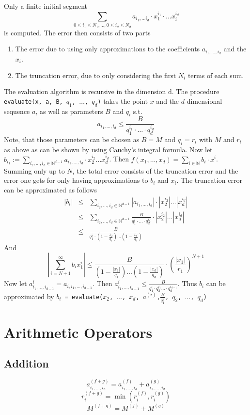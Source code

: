 \documentclass[]{article}
\newcommand{\NN}{\mathbb N}
\newcommand{\abs}[1]{\left|#1\right|}
\newcommand{\code}{\texttt}
\begin{document}
Only a finite initial segment
$$ \sum_{0 \leq i_1 \leq N_1, \dots, 0 \leq i_d \leq N_d } a_{i_1, \dots i_d} \cdot x_1^{i_1} \cdot \dots x_i^{i_d} $$
is computed.
The error then consists of two parts
\begin{enumerate}
  \item The error due to using only approximations to the coefficients $a_{i_1, \dots, i_d}$ and the $x_i$.
  \item The truncation error, due to only considering the first $N_i$ terms of each sum.
\end{enumerate}
The evaluation algorithm is recursive in the dimension d.
The procedure \code{evaluate(x, a, B, $q_1$, $\dots$, $q_d$)} takes the point $x$ and the $d$-dimensional sequence $a$, as well as parameters $B$ and $q_i$ s.t.
$$ a_{i_1, \dots, i_d} \leq \frac{B}{q_1^{i_1} \cdot \dots \cdot q_d^{i_d}} $$
Note, that those parameters can be chosen as $B=M$ and $q_i = r_i$ with $M$ and $r_i$ as above as can be shown by using Cauchy's integral formula.
Now let $b_{i_1} := \sum_{i_2, \dots, i_d \in \NN^{d-1}} a_{i_1, \dots, i_d} \cdot x_2^{i_2} \dots x_d^{i_d}$.
Then $f(x_1, \dots, x_d) = \sum_{i \in \NN} b_i\cdot x^i$.
Summing only up to $N$, the total error consists of the truncation error and the error one gets for only having approximations to $b_i$ and $x_i$.
The truncation error can be approximated as follows
\begin{eqnarray*}
\abs{b_i} &\leq& \sum_{i_2, \dots, i_d \in \NN^{d-1}} \abs{a_{i_1, \dots, i_d}} \cdot \abs{x_2^{i_2}} \dots \abs{x_d^{i_d}} \\
&\leq& \sum_{i_2, \dots, i_d \in \NN^{d-1}} \frac{B}{q_1^{i} \cdot \dots \cdot q_d^{i_d}} \cdot \abs{x_2^{i_2}} \dots \abs{x_d^{i_d}} \\
&\leq& \frac{B}{q_1^i \cdot (1-\frac{x_2}{q_1}) \dots (1-\frac{x_d}{q_d})}
\end{eqnarray*}
And
$$ \abs{ \sum_{i=N+1}^\infty b_i x_1^i } \leq \frac{B}{(1-\frac{\abs{x_1}}{q_1}) \dots (1-\frac{\abs{x_d}}{q_d}) }\cdot \left(\frac{\abs{x_1}}{r_1} \right)^{N+1} $$
Now let $a^{i}_{i_1, \dots, i_{d-1}} = a_{i, i_1, \dots, i_{d-1}}$.
Then $a^{i}_{i_1, \dots, i_{d-1}} \leq \frac{B}{q_1^{i} \cdot q_2^{i_1} \dots \cdot q_d^{i_{d-1}}}$.
Thus $b_i$ can be approximated by \code{$b_i$ = evaluate($x_2$, $\dots$, $x_d$, $a^{(i)}$,$\frac{B}{q_1^i}$, $q_2$, $\dots$, $q_d$)}
\section{Arithmetic Operators}
\subsection{Addition}
$$a^{(f+g)}_{i_1,\dots,i_d} = a^{(f)}_{i_1,\dots,i_d}+a^{(g)}_{i_1,\dots,i_d}$$
$$r_i^{(f+g)} = \min(r_i^{(f)}, r_i^{(g)}) $$
$$M^{(f+g)} = M^{(f)}+M^{(g)}$$
\end{document}
